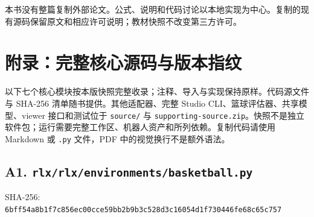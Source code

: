 \documentclass[
  chinese,
  11pt,
  letterpaper,
]{article}
\begin{document}
本书没有整篇复制外部论文。公式、说明和代码讨论以本地实现为中心。复制的现有源码保留原文和相应许可说明；教材快照不改变第三方许可。

\section{附录：完整核心源码与版本指纹}\label{ux9644ux5f55ux5b8cux6574ux6838ux5fc3ux6e90ux7801ux4e0eux7248ux672cux6307ux7eb9}

以下七个核心模块按本版快照完整收录；注释、导入与实现保持原样。代码源文件与
SHA-256 清单随书提供。其他适配器、完整 Studio
CLI、篮球评估器、共享模型、viewer 接口和测试位于 \texttt{source/} 与
\texttt{supporti\allowbreak{}ng-\allowbreak{}source.z\allowbreak{}ip}。快照不是独立软件包；运行需要完整工作区、机器人资产和所列依赖。复制代码请使用
Markdown 或 \texttt{.py} 文件，PDF 中的视觉换行不是额外语法。

\subsection{\texorpdfstring{A1.
\texttt{rlx/\allowbreak{}rlx/\allowbreak{}environm\allowbreak{}ents/\allowbreak{}basketba\allowbreak{}ll.py}}{A1. }}\label{a1.-rlxrlxenvironmentsbasketball.py}

SHA-256:
\texttt{6bff54a8\allowbreak{}b1f7c856\allowbreak{}ec00cce5\allowbreak{}9bb2b9b3\allowbreak{}c528d3c1\allowbreak{}6054d1f7\allowbreak{}30446fe6\allowbreak{}8c65c757\allowbreak{}}
\end{document}
